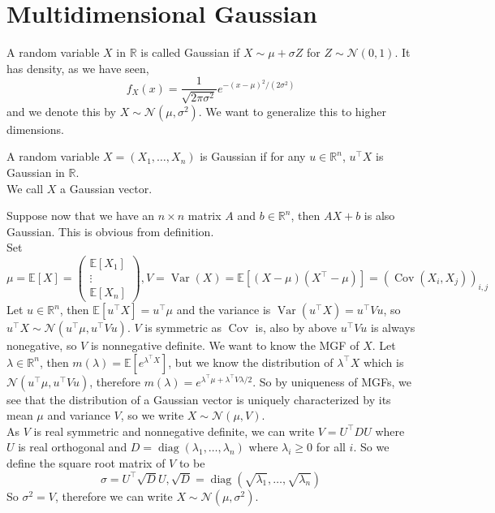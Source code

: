 \section{Multidimensional Gaussian}
A random variable $X$ in $\mathbb R$ is called Gaussian if $X\sim\mu+\sigma Z$ for $Z\sim\mathcal N(0,1)$.
It has density, as we have seen,
$$f_X(x)=\frac{1}{\sqrt{2\pi\sigma^2}}e^{-(x-\mu)^2/(2\sigma^2)}$$
and we denote this by $X\sim\mathcal N(\mu,\sigma^2)$.
We want to generalize this to higher dimensions.
\begin{definition}
    A random variable $X=(X_1,\ldots,X_n)$ is Gaussian if for any $u\in\mathbb R^n$, $u^\top X$ is Gaussian in $\mathbb R$.\\
    We call $X$ a Gaussian vector.
\end{definition}
Suppose now that we have an $n\times n$ matrix $A$ and $b\in\mathbb R^n$, then $AX+b$ is also Gaussian.
This is obvious from definition.\\
Set
$$\mu=\mathbb E[X]=\begin{pmatrix}
    \mathbb E[X_1]\\
    \vdots\\
    \mathbb E[X_n]
\end{pmatrix},V=\operatorname{Var}(X)=\mathbb E[(X-\mu)(X^\top-\mu)]=(\operatorname{Cov}(X_i,X_j))_{i,j}$$
Let $u\in\mathbb R^n$, then $\mathbb E[u^\top X]=u^\top\mu$ and the variance is $\operatorname{Var}(u^\top X)=u^\top Vu$, so $u^\top X\sim\mathcal N(u^\top\mu,u^\top Vu)$.
$V$ is symmetric as $\operatorname{Cov}$ is, also by above $u^\top Vu$ is always nonegative, so $V$ is nonnegative definite.
We want to know the MGF of $X$.
Let $\lambda\in\mathbb R^n$, then $m(\lambda)=\mathbb E[e^{\lambda^\top X}]$, but we know the distribution of $\lambda^\top X$ which is $\mathcal N(u^\top\mu,u^\top Vu)$, therefore $m(\lambda)=e^{\lambda^\top\mu+\lambda^\top V\lambda/2}$.
So by uniqueness of MGFs, we see that the distribution of a Gaussian vector is uniquely characterized by its mean $\mu$ and variance $V$, so we write $X\sim\mathcal N(\mu,V)$.\\
As $V$ is real symmetric and nonnegative definite, we can write $V=U^\top DU$ where $U$ is real orthogonal and $D=\operatorname{diag}(\lambda_1,\ldots,\lambda_n)$ where $\lambda_i\ge 0$ for all $i$.
So we define the square root matrix of $V$ to be
$$\sigma=U^\top \sqrt{D}U,\sqrt{D}=\operatorname{diag}(\sqrt{\lambda_1},\ldots,\sqrt{\lambda_n})$$
So $\sigma^2=V$, therefore we can write $X\sim\mathcal N(\mu,\sigma^2)$.\\
